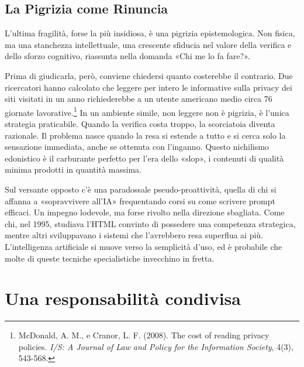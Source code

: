 \subsection{La Pigrizia come Rinuncia}

L'ultima fragilità, forse la più insidiosa, è una pigrizia epistemologica. Non fisica, ma una stanchezza intellettuale, una crescente sfiducia nel valore della verifica e dello sforzo cognitivo, riassunta nella domanda «Chi me lo fa fare?».

Prima di giudicarla, però, conviene chiedersi quanto costerebbe il contrario. Due ricercatori hanno calcolato che leggere per intero le informative sulla privacy dei siti visitati in un anno richiederebbe a un utente americano medio circa 76 giornate lavorative.\footnote{McDonald, A. M., e Cranor, L. F. (2008). The cost of reading privacy policies. \textit{I/S: A Journal of Law and Policy for the Information Society}, 4(3), 543-568.} In un ambiente simile, non leggere non è pigrizia, è l'unica strategia praticabile. Quando la verifica costa troppo, la scorciatoia diventa razionale. Il problema nasce quando la resa si estende a tutto e si cerca solo la sensazione immediata, anche se ottenuta con l'inganno. Questo nichilismo edonistico è il carburante perfetto per l'era dello «slop», i contenuti di qualità minima prodotti in quantità massima.

Sul versante opposto c'è una paradossale pseudo-proattività, quella di chi si affanna a «sopravvivere all'IA» frequentando corsi su come scrivere prompt efficaci. Un impegno lodevole, ma forse rivolto nella direzione sbagliata. Come chi, nel 1995, studiava l'HTML convinto di possedere una competenza strategica, mentre altri sviluppavano i sistemi che l'avrebbero resa superflua ai più. L'intelligenza artificiale si muove verso la semplicità d'uso, ed è probabile che molte di queste tecniche specialistiche invecchino in fretta.

\section{Una responsabilità condivisa}
\label{sec:p4c41-responsabilita}

